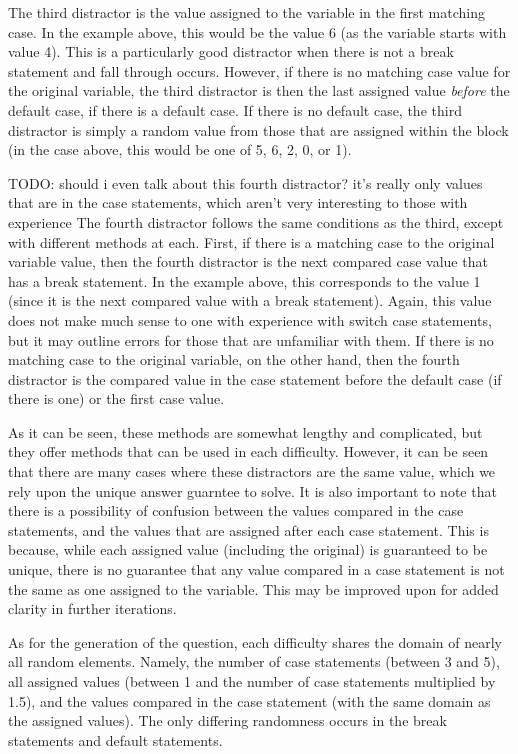 \documentclass{article}
\begin{document}
The third distractor is the value assigned to the variable in the first matching case. In the example above, this would be the value 6 (as the variable starts with value 4). This is a particularly good distractor when there is not a break statement
and fall through occurs. However, if there is no matching case value for the original variable, the third distractor is then the last assigned value \textit{before} the default case, if there is a
default case. If there is no default case, the third distractor is simply a random value from those that are assigned within the block (in the case above, this would be one of 5, 6, 2, 0, or 1). 

TODO: should i even talk about this fourth distractor? it's really only values that are in the case statements, which aren't very interesting to those with experience
The fourth distractor follows the same conditions as the third, except with different methods at each. First, if there is a matching case to the original variable value, then the fourth distractor
is the next compared case value that has a break statement. In the example above, this corresponds to the value 1 (since it is the next compared value with a break statement). Again, this
value does not make much sense to one with experience with switch case statements, but it may outline errors for those that are unfamiliar with them. If there is no matching case to the 
original variable, on the other hand, then the fourth distractor is the compared value in the case statement before the default case (if there is one) or the first case value. 

As it can be seen, these methods are somewhat lengthy and complicated, but they offer methods that can be used in each difficulty. However, it can be seen that there are many cases where 
these distractors are the same value, which we rely upon the unique answer guarntee to solve. It is also important to note that there is a possibility of confusion between the values compared 
in the case statements, and the values that are assigned after each case statement. This is because, while each assigned value (including the original) is guaranteed to be unique, there is no
guarantee that any value compared in a case statement is not the same as one assigned to the variable. This may be improved upon for added clarity in further iterations. 

As for the generation of the question, each difficulty shares the domain of nearly all random elements. Namely, the number of case statements (between 3 and 5), all 
assigned values (between 1 and the number of case statements multiplied by 1.5), and the values compared in the case statement (with the same domain as the assigned values). The only 
differing randomness occurs in the break statements and default statements.
\end{document}

